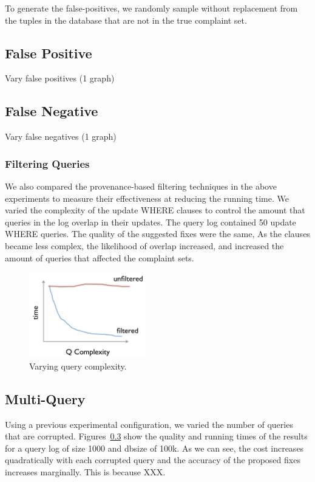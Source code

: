 To generate the false-positives, we randomly sample without replacement
from the tuples in the database that are not in the true complaint
set.

\subsection{False Positive}

Vary false positives (1 graph)


\subsection{False Negative}

Vary false negatives (1 graph)

\subsubsection{Filtering Queries}

We also compared the provenance-based filtering techniques in the above experiments
to measure their effectiveness at reducing the running time.  We varied the complexity of the update 
WHERE clauses to control the amount that queries in the log overlap in their updates.  The query log contained 50 update WHERE queries.
The quality of the suggested fixes were the same,  As the clauses became less complex, the likelihood 
of overlap increased, and increased the amount of queries that affected the complaint sets.


\begin{figure}[h]
\centering
\includegraphics[width = 2in]{figures/complete_qfilter_complexity}
\caption{Varying query complexity.}
\label{f:complete_qfilter_complexity} 
\end{figure}



\subsection{Multi-Query}

Using a previous experimental configuration, we varied the number of queries that are corrupted.  Figures~\ref{}
show the quality and running times of the results for a query log of size 1000 and dbsize of 100k.  
As we can see, the cost increases quadratically with each corrupted query and the accuracy of the proposed fixes increases marginally.  
This is because XXX.

